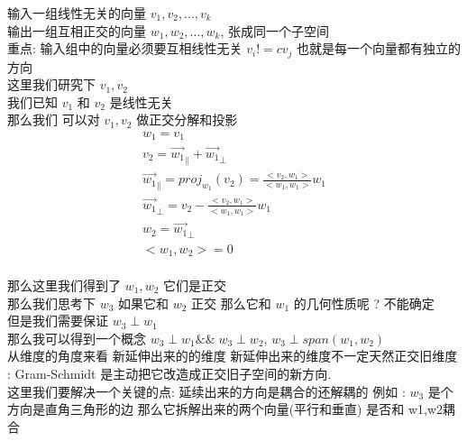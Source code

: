 \documentclass[12pt]{article}
\begin{document}
\begin{flushleft}
    \begin{itemize}

        输入一组线性无关的向量 ${v_{1}, v_{2}, ..., v_{k}}$ \\
        输出一组互相正交的向量 ${w_{1}, w_{2}, ..., w_{k}}$, 张成同一个子空间 \\
        重点: 输入组中的向量必须要互相线性无关 $v_{i} != cv_{j}$ 也就是每一个向量都有独立的方向 \\

        这里我们研究下 $v_{1},v_{2}$ \\
        我们已知 $v_{1}$ 和 $v_{2}$ 是线性无关 \\
        那么我们 可以对 $v_{1}, v_{2}$ 做正交分解和投影 \\
        \begin{align}
            w_{1} = v_{1}                                                                            \\
            v_{2} = \vec{w_{1}}_{\parallel} + \vec{w_{1}}_{\perp}                                    \\
            \vec{w_{1}}_{\parallel} = proj_{w_{1}}(v_{2}) = \frac{<v_{2},w_{1}>}{<w_{1},w_{1}>}w_{1} \\
            \vec{w_{1}}_{\perp} =  v_{2} -  \frac{<v_{2},w_{1}>}{<w_{1},w_{1}>}w_{1}                 \\
            w_{2} = \vec{w_{1}}_{\perp}                                                              \\
            <w_{1}, w_{2} > = 0                                                                      \\
        \end{align}

        那么这里我们得到了 $w_{1},w_{2}$ 它们是正交 \\
        那么我们思考下 $w_{3}$ 如果它和 $w_{2}$ 正交 那么它和 $w_{1}$ 的几何性质呢 ?  不能确定 \\
        但是我们需要保证 $w_{3} \perp w_{1}$  \\
        那么我可以得到一个概念 $w_{3} \perp w_{1} \&\& \; w_{3} \perp w_{2}$, $w_{3} \perp span(w_{1}, w_{2})$ \\
        从维度的角度来看 新延伸出来的的维度 新延伸出来的维度不一定天然正交旧维度 : Gram-Schmidt 是主动把它改造成正交旧子空间的新方向. \\
        这里我们要解决一个关键的点: 延续出来的方向是耦合的还解耦的  例如 : $w_{3}$ 是个方向是直角三角形的边 那么它拆解出来的两个向量(平行和垂直) 是否和 w1,w2耦合


\end{itemize}
\end{flushleft}
\end{document}
